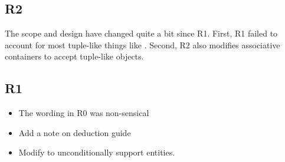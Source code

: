 \documentclass{wg21}
\begin{document}
\subsection{R2}

The scope and design have changed quite a bit since R1. First, R1 failed to account for most tuple-like things like .
Second, R2 also modifies associative containers to accept tuple-like objects.

\subsection{R1}
\begin{itemize}
    \item The wording in R0 was non-sensical
    \item Add a note on deduction guide
    \item Modify  to unconditionally support  entities.
\end{itemize}

\pagebreak
\end{document}
